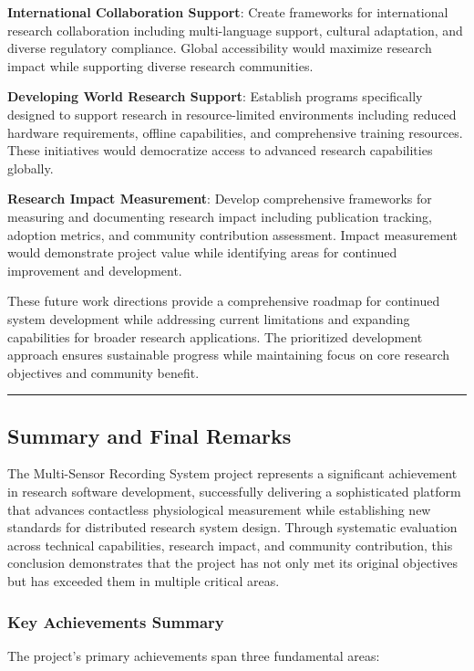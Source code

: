 \documentclass[12pt,a4paper]{article}
\begin{document}
\textbf{International Collaboration Support}: Create frameworks for international research collaboration including
multi-language support, cultural adaptation, and diverse regulatory compliance. Global accessibility would maximize
research impact while supporting diverse research communities.

\textbf{Developing World Research Support}: Establish programs specifically designed to support research in resource-limited
environments including reduced hardware requirements, offline capabilities, and comprehensive training resources. These
initiatives would democratize access to advanced research capabilities globally.

\textbf{Research Impact Measurement}: Develop comprehensive frameworks for measuring and documenting research impact
including publication tracking, adoption metrics, and community contribution assessment. Impact measurement would
demonstrate project value while identifying areas for continued improvement and development.

These future work directions provide a comprehensive roadmap for continued system development while addressing current
limitations and expanding capabilities for broader research applications. The prioritized development approach ensures
sustainable progress while maintaining focus on core research objectives and community benefit.

\hrule

\subsection{Summary and Final Remarks}

The Multi-Sensor Recording System project represents a significant achievement in research software development,
successfully delivering a sophisticated platform that advances contactless physiological measurement while establishing
new standards for distributed research system design. Through systematic evaluation across technical capabilities,
research impact, and community contribution, this conclusion demonstrates that the project has not only met its original
objectives but has exceeded them in multiple critical areas.

\subsubsection{Key Achievements Summary}

The project's primary achievements span three fundamental areas:
\end{document}
